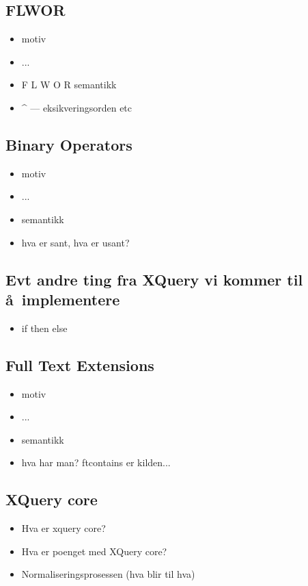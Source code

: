 \subsection{FLWOR}

\begin{itemize}
\item motiv
\item ...
\item F L W O R semantikk
\item \^{} --- eksikveringsorden etc
\end{itemize}

\subsection{Binary Operators}

\begin{itemize}
\item motiv
\item ...
\item semantikk
\item hva er sant, hva er usant?
\end{itemize}

\subsection{Evt andre ting fra XQuery vi kommer til \aa~implementere}

\begin{itemize}
\item if then else

\end{itemize}

\subsection{Full Text Extensions}

\begin{itemize}
\item motiv
\item ...
\item semantikk
\item hva har man? ftcontains er kilden...
\end{itemize}

\subsection{XQuery core}
\begin{itemize}
  \item Hva er xquery core?
  \item Hva er poenget med XQuery core?
  \item Normaliseringsprosessen (hva blir til hva)
\end{itemize}

